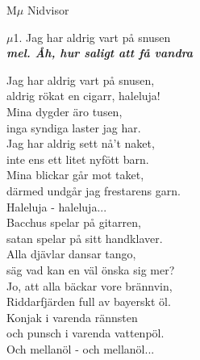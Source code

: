 \documentclass[a6paper,10pt]{article}
\newcommand{\mel}[1]{\small\textbf{\textit{mel. #1 \\}}}
\begin{document}
\noindent
\huge{M$\mu$ Nidvisor}
\begin{center}
\Large $\mu$1. Jag har aldrig vart på snusen \\
\mel{Åh, hur saligt att få vandra}
\end{center}
\small Jag har aldrig vart på snusen,\\
aldrig rökat en cigarr, haleluja!\\
Mina dygder äro tusen,\\
inga syndiga laster jag har.\\
Jag har aldrig sett nå't naket,\\
inte ens ett litet nyfött barn.\\
Mina blickar går mot taket,\\
därmed undgår jag frestarens garn.
\vspace{5pt}\\
Haleluja - haleluja...
\vspace{5pt}\\
Bacchus spelar på gitarren,\\
satan spelar på sitt handklaver.\\
Alla djävlar dansar tango,\\
säg vad kan en väl önska sig mer?\\
Jo, att alla bäckar vore brännvin,\\
Riddarfjärden full av bayerskt öl.\\
Konjak i varenda rännsten\\
och punsch i varenda vattenpöl.
\vspace{5pt}\\
Och mellanöl - och mellanöl... 
\end{document}

